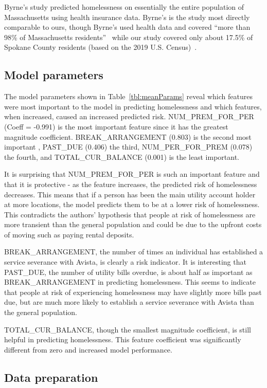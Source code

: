 \documentclass[10pt,letterpaper]{article}
\begin{document}
Byrne's study predicted homelessness on essentially the entire population of Massachusetts using health insurance data. Byrne's is the study most directly comparable to ours, though Byrne's used health data and covered ``more than 98\% of Massachusetts residents''~\cite{byrne2020classification} while our study covered only about 17.5\% of Spokane County residents (based on the 2019 U.S. Census)~\cite{SpokanePop}.

\subsection*{Model parameters}
The model parameters shown in Table~\ref{tbl:meanParams} reveal which features were most important to the model in predicting homelessness and which features, when increased, caused an increased predicted risk. NUM\_PREM\_FOR\_PER (Coeff = -0.991) is the most important feature since it has the greatest magnitude coefficient. BREAK\_ARRANGEMENT (0.803) is the second most important , PAST\_DUE (0.406) the third, NUM\_PER\_FOR\_PREM (0.078) the fourth, and TOTAL\_CUR\_BALANCE (0.001) is the least important.

It is surprising that NUM\_PREM\_FOR\_PER is such an important feature and that it is protective - as the feature increases, the predicted risk of homelessness decreases. This means that if a person has been the main utility account holder at more locations, the model predicts them to be at a lower risk of homelessness. This contradicts the authors' hypothesis that people at risk of homelessness are more transient than the general population and could be due to the upfront costs of moving such as paying rental deposits.

BREAK\_ARRANGEMENT, the number of times an individual has established a service severance with Avista, is clearly a risk indicator. It is interesting that PAST\_DUE, the number of utility bills overdue, is about half as important as BREAK\_ARRANGEMENT in predicting homelessness. This seems to indicate that people at risk of experiencing homelessness may have slightly more bills past due, but are much more likely to establish a service severance with Avista than the general population. 

TOTAL\_CUR\_BALANCE, though the smallest magnitude coefficient, is still helpful in predicting homelessness. This feature coefficient was significantly different from zero and increased model performance.

\subsection*{Data preparation}
\end{document}
